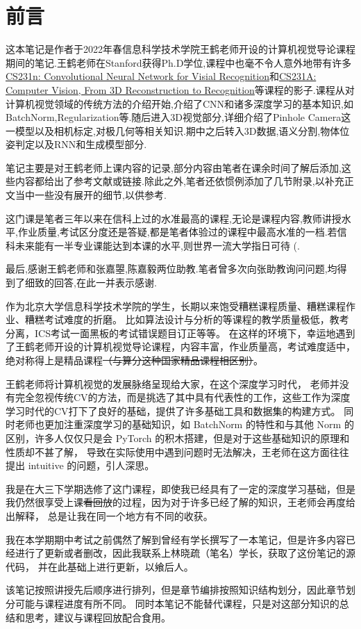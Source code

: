 \section*{前言}

这本笔记是作者于2022年春信息科学技术学院王鹤老师开设的计算机视觉导论课程期间的笔记.王鹤老师在Stanford获得Ph.D学位,课程中也毫不令人意外地带有许多\href{https://cs231n.github.io/}{CS231n: Convolutional Neural Network for Visial Recognition}和\href{https://web.stanford.edu/class/cs231a/course_notes.html}{CS231A: Computer Vision, From 3D Reconstruction to Recognition}等课程的影子.课程从对计算机视觉领域的传统方法的介绍开始,介绍了CNN和诸多深度学习的基本知识,如BatchNorm,Regularization等.随后进入3D视觉部分,详细介绍了Pinhole Camera这一模型以及相机标定,对极几何等相关知识.期中之后转入3D数据,语义分割,物体位姿判定以及RNN和生成模型部分.

笔记主要是对王鹤老师上课内容的记录,部分内容由笔者在课余时间了解后添加,这些内容都给出了参考文献或链接.除此之外,笔者还依惯例添加了几节附录,以补充正文当中一些没有展开的细节,以供参考.

这门课是笔者三年以来在信科上过的水准最高的课程,无论是课程内容,教师讲授水平,作业质量,考试区分度还是答疑,都是笔者体验过的课程中最高水准的一档.若信科未来能有一半专业课能达到本课的水平,则世界一流大学指日可待 (.

最后,感谢王鹤老师和张嘉曌,陈嘉毅两位助教.笔者曾多次向张助教询问问题,均得到了细致的回答,在此一并表示感谢.



作为北京大学信息科学技术学院的学生，长期以来饱受糟糕课程质量、糟糕课程作业、糟糕考试难度的折磨。
比如算法设计与分析的等课程的教学质量极低，教考分离，ICS考试一面黑板的考试错误题目订正等等。
在这样的环境下，幸运地遇到了王鹤老师开设的计算机视觉导论课程，内容丰富，作业质量高，考试难度适中，
绝对称得上是精品课程\sout{（与算分这种国家精品课程相区别）}。

王鹤老师将计算机视觉的发展脉络呈现给大家，在这个深度学习时代，
老师并没有完全忽视传统CV的方法，而是挑选了其中具有代表性的工作，这些工作为深度学习时代的CV打下了良好的基础，提供了许多基础工具和数据集的构建方式。
同时老师也更加注重深度学习的基础知识，如 BatchNorm 的特性和与其他 Norm 的区别，许多人仅仅只是会 PyTorch 的积木搭建，但是对于这些基础知识的原理和性质却不甚了解，
导致在实际使用中遇到问题时无法解决，王老师在这方面往往提出 intuitive 的问题，引人深思。

我是在大三下学期选修了这门课程，即使我已经具有了一定的深度学习基础，但是我仍然很享受上课\sout{看回放}的过程，因为对于许多已经了解的知识，王老师会再度给出解释，
总是让我在同一个地方有不同的收获。

我在本学期期中考试之前偶然了解到曾经有学长撰写了一本笔记，但是许多内容已经进行了更新或者删改，因此我联系上林晓疏（笔名）学长，获取了这份笔记的源代码，
并在此基础上进行更新，以飨后人。

该笔记按照讲授先后顺序进行排列，但是章节编排按照知识结构划分，因此章节划分可能与课程进度有所不同。
同时本笔记不能替代课程，只是对这部分知识的总结和思考，建议与课程回放配合食用。

